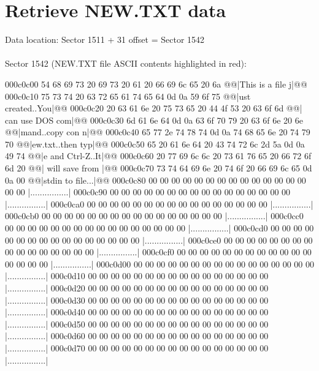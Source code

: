 \documentclass{article}
\begin{document}
    \section{Retrieve NEW.TXT data}\label{sec:new_txt_data}
    Data location: Sector 1511 + 31 offset = Sector 1542
    \\
    \\
    Sector 1542 (NEW.TXT file ASCII contents highlighted in red):

    \begin{hexlsting}
        000c0c00  54 68 69 73 20 69 73 20  61 20 66 69 6c 65 20 6a  @@|This is a file j|@@
        000c0c10  75 73 74 20 63 72 65 61  74 65 64 0d 0a 59 6f 75  @@|ust created..You|@@
        000c0c20  20 63 61 6e 20 75 73 65  20 44 4f 53 20 63 6f 6d  @@| can use DOS com|@@
        000c0c30  6d 61 6e 64 0d 0a 63 6f  70 79 20 63 6f 6e 20 6e  @@|mand..copy con n|@@
        000c0c40  65 77 2e 74 78 74 0d 0a  74 68 65 6e 20 74 79 70  @@|ew.txt..then typ|@@
        000c0c50  65 20 61 6e 64 20 43 74  72 6c 2d 5a 0d 0a 49 74  @@|e and Ctrl-Z..It|@@
        000c0c60  20 77 69 6c 6c 20 73 61  76 65 20 66 72 6f 6d 20  @@| will save from |@@
        000c0c70  73 74 64 69 6e 20 74 6f  20 66 69 6c 65 0d 0a 00  @@|stdin to file...|@@
        000c0c80  00 00 00 00 00 00 00 00  00 00 00 00 00 00 00 00  |................|
        000c0c90  00 00 00 00 00 00 00 00  00 00 00 00 00 00 00 00  |................|
        000c0ca0  00 00 00 00 00 00 00 00  00 00 00 00 00 00 00 00  |................|
        000c0cb0  00 00 00 00 00 00 00 00  00 00 00 00 00 00 00 00  |................|
        000c0cc0  00 00 00 00 00 00 00 00  00 00 00 00 00 00 00 00  |................|
        000c0cd0  00 00 00 00 00 00 00 00  00 00 00 00 00 00 00 00  |................|
        000c0ce0  00 00 00 00 00 00 00 00  00 00 00 00 00 00 00 00  |................|
        000c0cf0  00 00 00 00 00 00 00 00  00 00 00 00 00 00 00 00  |................|
        000c0d00  00 00 00 00 00 00 00 00  00 00 00 00 00 00 00 00  |................|
        000c0d10  00 00 00 00 00 00 00 00  00 00 00 00 00 00 00 00  |................|
        000c0d20  00 00 00 00 00 00 00 00  00 00 00 00 00 00 00 00  |................|
        000c0d30  00 00 00 00 00 00 00 00  00 00 00 00 00 00 00 00  |................|
        000c0d40  00 00 00 00 00 00 00 00  00 00 00 00 00 00 00 00  |................|
        000c0d50  00 00 00 00 00 00 00 00  00 00 00 00 00 00 00 00  |................|
        000c0d60  00 00 00 00 00 00 00 00  00 00 00 00 00 00 00 00  |................|
        000c0d70  00 00 00 00 00 00 00 00  00 00 00 00 00 00 00 00  |................|

\end{hexlsting}
\end{document}
